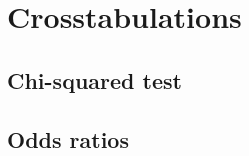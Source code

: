 %
%
%
\section{Crosstabulations}

	\subsection{Chi-squared test}%
    \label{sec:chi2}


	\subsection{Odds ratios}
